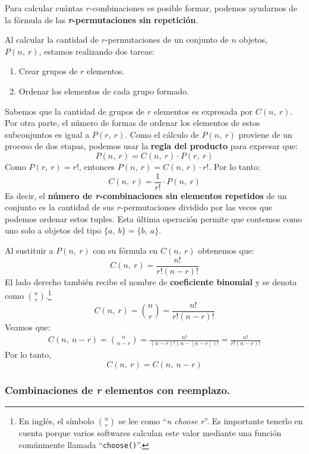 \documentclass[12pt]{article}
\begin{document}
Para calcular cuántas $r$-combinaciones es posible formar, podemos ayudarnos de la fórmula de las \textbf{\textit{r}-permutaciones sin repetición}.

Al calcular la cantidad de $r$-permutaciones de un conjunto de $n$ objetos, $P(n, \ r)$, estamos realizando dos tareas:

\begin{enumerate}
\item Crear grupos de $r$ elementos.
\item Ordenar los elementos de cada grupo formado.
\end{enumerate}

Sabemos que la cantidad de grupos de $r$ elementos es expresada por $C(n, \ r)$. Por otra parte, el número de formas de ordenar los elementos de estos subconjuntos es igual a $P(r, \ r)$. Como el cálculo de $P(n, \ r)$ proviene de un proceso de dos etapas, podemos usar la \textbf{regla del producto} para expresar que:
\[
  P(n, \ r) = C(n, \ r) \cdot P(r, \ r)
\]
Como $P(r, \ r) = r!$, entonces $P(n, \ r) = C(n, \ r) \cdot r!$. Por lo tanto:
\[
  C(n, \ r) = \frac{1}{r!} \cdot P(n, \ r)
\]
Es decir, el \textbf{número de \textit{r}-combinaciones sin elementos repetidos} de un conjunto es la cantidad de sus $r$-permutaciones dividido por las veces que podemos ordenar estos tuples. Esta última operación permite que contemos como uno solo a objetos del tipo $\{a, \ b\} = \{b, \ a\}$.

Al sustituir a $P(n, \ r)$ con su fórmula en $C(n, \ r)$ obtenemos que:
\[
  C(n, \ r) = \frac{n!}{r! (n - r)!}
\]
El lado derecho también recibe el nombre de \textbf{coeficiente binomial} y se denota como $\binom{n}{r}$.\footnote{En inglés, el símbolo $\binom{n}{r}$ se lee como ``\textit{n choose r}''. Es importante tenerlo en cuenta porque varios softwares calculan este valor mediante una función comúnmente llamada ``\texttt{choose()}''.}
\[
  C(n, \ r) = \binom{n}{r} = \frac{n!}{r! (n - r)!}
\]
Veamos que:
\begin{align*}
C(n, \ n - r) = \binom{n}{n - r}
              = \frac{n!}{(n - r)! (n - [n - r])!}
              = \frac{n!}{r!(n - r)!}
\end{align*}
Por lo tanto,
\[
  C(n, \ r) = C(n, \ n - r)
\]

\subsubsection{Combinaciones de \textit{r} elementos con reemplazo.}
\end{document}
